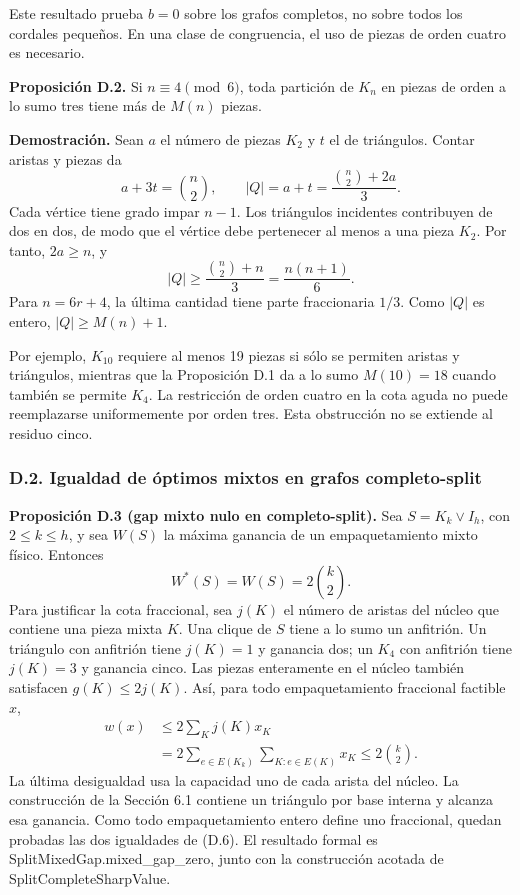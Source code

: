 \documentclass[spanish,11pt,a4paper]{article}
\begin{document}
Este resultado prueba \(b=0\) sobre los grafos completos, no sobre todos los cordales pequeños. En una clase de congruencia, el uso de piezas de orden cuatro es necesario.

\textbf{Proposición D.2.} Si \(n\equiv4\pmod6\), toda partición de \(K_n\) en piezas de orden a lo sumo tres tiene más de \(M(n)\) piezas.

\textbf{Demostración.} Sean \(a\) el número de piezas \(K_2\) y \(t\) el de triángulos. Contar aristas y piezas da \[
a+3t=\binom n2,\qquad |Q|=a+t=\frac{\binom n2+2a}{3}.
\tag{D.5}
\] Cada vértice tiene grado impar \(n-1\). Los triángulos incidentes contribuyen de dos en dos, de modo que el vértice debe pertenecer al menos a una pieza \(K_2\). Por tanto, \(2a\ge n\), y \[
|Q|\ge\frac{\binom n2+n}{3}=\frac{n(n+1)}6.
\] Para \(n=6r+4\), la última cantidad tiene parte fraccionaria \(1/3\). Como \(|Q|\) es entero, \(|Q|\ge M(n)+1\).

Por ejemplo, \(K_{10}\) requiere al menos 19 piezas si sólo se permiten aristas y triángulos, mientras que la Proposición D.1 da a lo sumo \(M(10)=18\) cuando también se permite \(K_4\). La restricción de orden cuatro en la cota aguda no puede reemplazarse uniformemente por orden tres. Esta obstrucción no se extiende al residuo cinco.


\subsubsection{D.2. Igualdad de óptimos mixtos en grafos completo-split}\label{d.2.-igualdad-de-optimos-mixtos-en-grafos-completo-split}

\textbf{Proposición D.3 (gap mixto nulo en completo-split).} Sea \(S=K_k\vee I_h\), con \(2\le k\le h\), y sea \(W(S)\) la máxima ganancia de un empaquetamiento mixto físico. Entonces \[
W^*(S)=W(S)=2\binom k2.
\tag{D.6}
\] Para justificar la cota fraccional, sea \(j(K)\) el número de aristas del núcleo que contiene una pieza mixta \(K\). Una clique de \(S\) tiene a lo sumo un anfitrión. Un triángulo con anfitrión tiene \(j(K)=1\) y ganancia dos; un \(K_4\) con anfitrión tiene \(j(K)=3\) y ganancia cinco. Las piezas enteramente en el núcleo también satisfacen \(g(K)\le2j(K)\). Así, para todo empaquetamiento fraccional factible \(x\), \[
\begin{aligned}
w(x)&\le2\sum_K j(K)x_K\\
&=2\sum_{e\in E(K_k)}\sum_{K:e\in E(K)}x_K
\le2\binom k2.
\end{aligned}
\tag{D.7}
\] La última desigualdad usa la capacidad uno de cada arista del núcleo. La construcción de la Sección 6.1 contiene un triángulo por base interna y alcanza esa ganancia. Como todo empaquetamiento entero define uno fraccional, quedan probadas las dos igualdades de (D.6). El resultado formal es {\ttfamily\small SplitMixedGa\discretionary{\hbox{\ensuremath{\hookrightarrow}}}{}{}p.\discretionary{\hbox{\ensuremath{\hookrightarrow}}}{}{}mixed\_\discretionary{\hbox{\ensuremath{\hookrightarrow}}}{}{}gap\_\discretionary{\hbox{\ensuremath{\hookrightarrow}}}{}{}zero}, junto con la construcción acotada de {\ttfamily\small SplitComplet\discretionary{\hbox{\ensuremath{\hookrightarrow}}}{}{}eSharpValue}.
\end{document}

